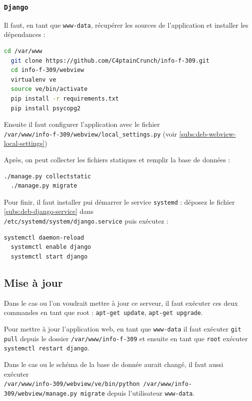 \documentclass[10pt,a4paper]{article}
\begin{document}
\subsubsection{\texttt{Django}}

Il faut, en tant que \texttt{www-data}, récupérer les sources de l'application et installer les dépendances :
\begin{lstlisting}[language=bash]
  cd /var/www
  git clone https://github.com/C4ptainCrunch/info-f-309.git
  cd info-f-309/webview
  virtualenv ve
  source ve/bin/activate
  pip install -r requirements.txt
  pip install psycopg2
\end{lstlisting}

Ensuite il faut configurer l'application avec le fichier\\
\texttt{/var/www/info-f-309/webview/local\_settings.py}
(voir \ref{subs:deb-webview-local-settings})

Après, on peut collecter les fichiers statiques et remplir la base de données :
\begin{lstlisting}[language=bash]
  ./manage.py collectstatic
  ./manage.py migrate
\end{lstlisting}

Pour finir, il faut installer pui démarrer le service \texttt{systemd} :
déposez le fichier \ref{subs:deb-django-service} dans \\\texttt{/etc/systemd/system/django.service} puis exécutez :
\begin{lstlisting}[language=bash]
  systemctl daemon-reload
  systemctl enable django
  systemctl start django
\end{lstlisting}


\subsection{Mise à jour}

Dans le cas ou l'on voudrait mettre à jour ce serveur,
il faut exécuter ces deux commandes en tant que root :
\texttt{apt-get update}, \texttt{apt-get upgrade}.

Pour mettre à jour l'application web, en tant que \texttt{www-data}
il faut exécuter \texttt{git pull} depuis le dossier \texttt{/var/www/info-f-309}
et ensuite en tant que \texttt{root} exécuter \texttt{systemctl restart django}.

Dans le cas ou le schéma de la base de donnée aurait changé,
il faut aussi exécuter \\\texttt{/var/www/info-309/webview/ve/bin/python /var/www/info-309/webview/manage.py migrate} depuis l'utilisateur \texttt{www-data}.
\end{document}
